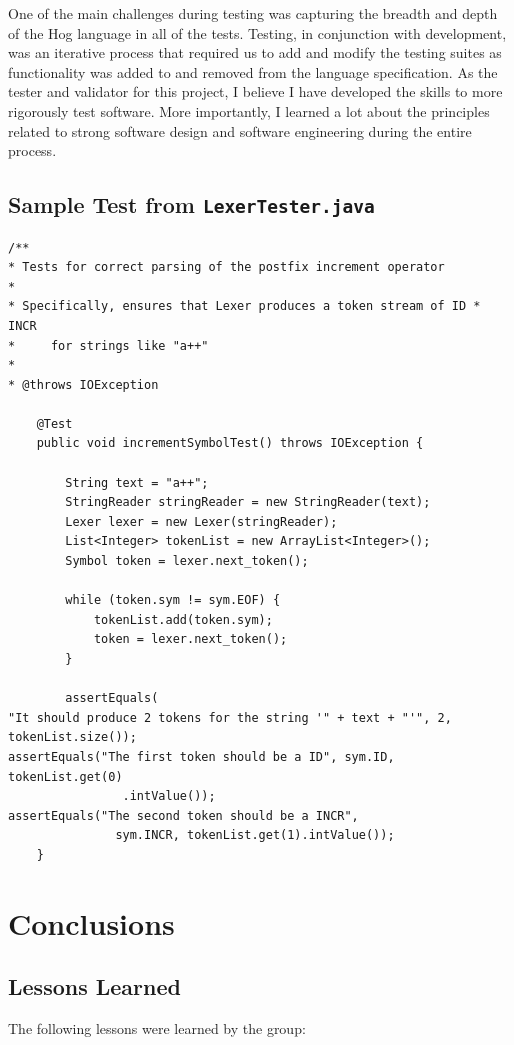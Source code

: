 \documentclass{report}
\begin{document}
One of the main challenges during testing was capturing the breadth and depth of the Hog language in all of the tests. Testing, in conjunction with development, was an iterative process that required us to add and modify the testing suites as functionality was added to and removed from the language specification. As the tester and validator for this project, I believe I have developed the skills to more rigorously test software. More importantly, I learned a lot about the principles related to strong software design and software engineering during the entire process. 

\section{Sample Test from \tt LexerTester.java\rm}

\begin{verbatim}
/**
* Tests for correct parsing of the postfix increment operator
* 
* Specifically, ensures that Lexer produces a token stream of ID * INCR 
*     for strings like "a++"
* 
* @throws IOException

	@Test
	public void incrementSymbolTest() throws IOException {

		String text = "a++";
		StringReader stringReader = new StringReader(text);
		Lexer lexer = new Lexer(stringReader);
		List<Integer> tokenList = new ArrayList<Integer>();
		Symbol token = lexer.next_token();

		while (token.sym != sym.EOF) {
			tokenList.add(token.sym);
			token = lexer.next_token();
		}

		assertEquals(
"It should produce 2 tokens for the string '" + text + "'", 2, tokenList.size());
assertEquals("The first token should be a ID", sym.ID, tokenList.get(0)
				.intValue());
assertEquals("The second token should be a INCR", 
               sym.INCR, tokenList.get(1).intValue());
	}
\end{verbatim}

\chapter{Conclusions}
\label{chap:concl}

\section{Lessons Learned}
\label{sec:lessons}

The following lessons were learned by the group:
\end{document}
